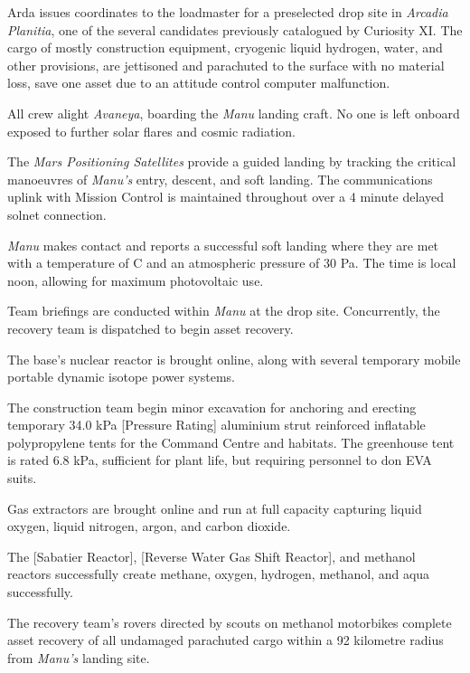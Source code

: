 Arda issues coordinates to the loadmaster for a preselected drop site in {\it Arcadia Planitia}, one of the several candidates previously catalogued by Curiosity XI. The cargo of mostly construction equipment, cryogenic liquid hydrogen, water, and other provisions, are jettisoned and parachuted to the surface with no material loss, save one asset due to an attitude control computer malfunction.
\StopTimelineDate

All crew alight {\it Avaneya}, boarding the {\it Manu} landing craft. No one is left onboard exposed to further solar flares and cosmic radiation.

The {\it Mars Positioning Satellites} provide a guided landing by tracking the critical manoeuvres of {\it Manu's} entry, descent, and soft landing. The communications uplink with Mission Control is maintained throughout over a 4 minute delayed solnet connection.

{\it Manu} makes contact and reports a successful soft landing where they are met with a temperature of C and an atmospheric pressure of 30 Pa. The time is local noon, allowing for maximum photovoltaic use.

Team briefings are conducted within {\it Manu} at the drop site. Concurrently, the recovery team is dispatched to begin asset recovery.

The base's nuclear reactor is brought online, along with several temporary mobile portable dynamic isotope power systems.

The construction team begin minor excavation for anchoring and erecting temporary 34.0 kPa [Pressure Rating] aluminium strut reinforced inflatable polypropylene tents for the Command Centre and habitats. The greenhouse tent is rated 6.8 kPa, sufficient for plant life, but requiring personnel to don EVA suits.
\StopTimelineDate

Gas extractors are brought online and run at full capacity capturing liquid oxygen, liquid nitrogen, argon, and carbon dioxide. 

The [Sabatier Reactor], [Reverse Water Gas Shift Reactor], and methanol reactors successfully create methane, oxygen, hydrogen, methanol, and aqua successfully.
\StopTimelineDate

The recovery team's rovers directed by scouts on methanol motorbikes complete asset recovery of all undamaged parachuted cargo within a 92 kilometre radius from {\it Manu's} landing site.
\StopTimelineDate

